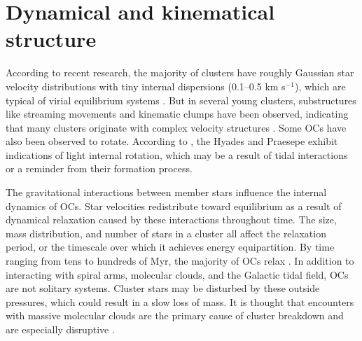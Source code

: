 \documentclass[referee]{raa}            %
\begin{document}
\section{Dynamical and kinematical structure}
\label{sec:kinematics}

According to recent research, the majority of clusters have roughly Gaussian star velocity distributions with tiny internal dispersions (0.1–0.5 km s$^{-1}$), which are typical of virial equilibrium systems \citep{Soubiran_2018}. But in several young clusters, substructures like streaming movements and kinematic clumps have been observed, indicating that many clusters originate with complex velocity structures \citep{KounkelCovey2019}. Some OCs have also been observed to rotate. According to \citet{2021A&A...654A.122G}, the Hyades and Praesepe exhibit indications of light internal rotation, which may be a result of tidal interactions or a reminder from their formation process.

The gravitational interactions between member stars influence the internal dynamics of OCs. Star velocities redistribute toward equilibrium as a result of dynamical relaxation caused by these interactions throughout time. The size, mass distribution, and number of stars in a cluster all affect the relaxation period, or the timescale over which it achieves energy equipartition. By time ranging from tens to hundreds of Myr, the majority of OCs relax \citep{binney08}. In addition to interacting with spiral arms, molecular clouds, and the Galactic tidal field, OCs are not solitary systems. Cluster stars may be disturbed by these outside pressures, which could result in a slow loss of mass. It is thought that encounters with massive molecular clouds are the primary cause of cluster breakdown and are especially disruptive \citep{Spitzer1971, 2020MNRAS.498.2472K}.
\end{document}

